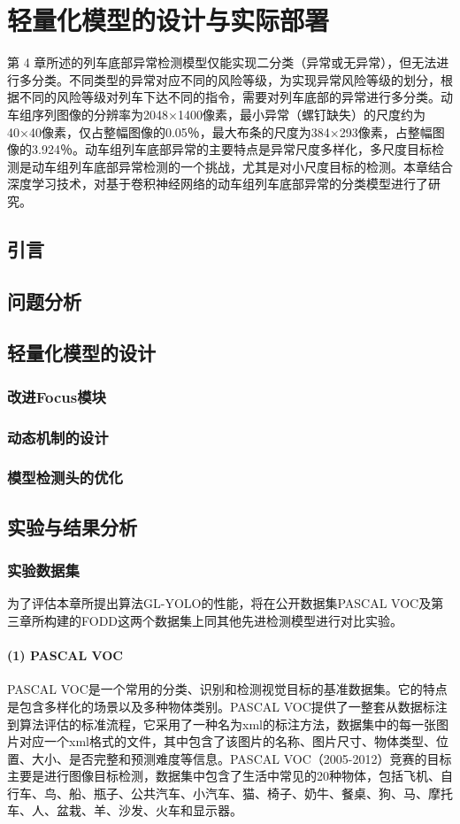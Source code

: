\chapter{轻量化模型的设计与实际部署}
第 4 章所述的列车底部异常检测模型仅能实现二分类（异常或无异常），但无法进行多分类。不同类型的异常对应不同的风险等级，为实现异常风险等级的划分，根据不同的风险等级对列车下达不同的指令，需要对列车底部的异常进行多分类。动车组序列图像的分辨率为2048×1400像素，最小异常（螺钉缺失）的尺度约为40×40像素，仅占整幅图像的0.05％，最大布条的尺度为384×293像素，占整幅图像的3.924％。动车组列车底部异常的主要特点是异常尺度多样化，多尺度目标检测是动车组列车底部异常检测的一个挑战，尤其是对小尺度目标的检测。本章结合深度学习技术，对基于卷积神经网络的动车组列车底部异常的分类模型进行了研究。
\section{引言}
\section{问题分析}
\section{轻量化模型的设计}
\subsection{改进Focus模块}
\subsection{动态机制的设计}
\subsection{模型检测头的优化}
\section{实验与结果分析}
\subsection{实验数据集}
为了评估本章所提出算法GL-YOLO的性能，将在公开数据集PASCAL VOC及第三章所构建的FODD这两个数据集上同其他先进检测模型进行对比实验。
\subsubsection*{(1) PASCAL VOC}
PASCAL VOC\cite{pascalvoc07, pascalvoc12}是一个常用的分类、识别和检测视觉目标的基准数据集。它的特点是包含多样化的场景以及多种物体类别。PASCAL VOC提供了一整套从数据标注到算法评估的标准流程，它采用了一种名为xml的标注方法，数据集中的每一张图片对应一个xml格式的文件，其中包含了该图片的名称、图片尺寸、物体类型、位置、大小、是否完整和预测难度等信息。PASCAL VOC（2005-2012）竞赛的目标主要是进行图像目标检测，数据集中包含了生活中常见的20种物体，包括飞机、自行车、鸟、船、瓶子、公共汽车、小汽车、猫、椅子、奶牛、餐桌、狗、马、摩托车、人、盆栽、羊、沙发、火车和显示器。

